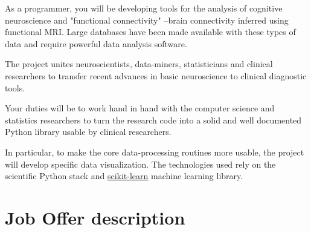 \documentclass{article}
\begin{document}
As a programmer, you will be developing tools for the analysis of cognitive neuroscience and "functional connectivity" --brain connectivity inferred using functional MRI. Large databases have been made available with these types of data and require powerful data analysis software.

The project unites neuroscientists, data-miners, statisticians and clinical researchers to transfer recent advances in basic neuroscience to clinical diagnostic tools.

Your duties will be to work hand in hand with the computer science and statistics researchers to turn the research code into a solid and well documented Python library usable by clinical researchers.

In particular, to make the core data-processing routines more usable, the project will develop specific data visualization. The technologies used rely on the scientific Python stack and \href{https://scikit-learn.org/stable/}{scikit-learn} machine learning library.

\section*{Job Offer description}
\end{document}
